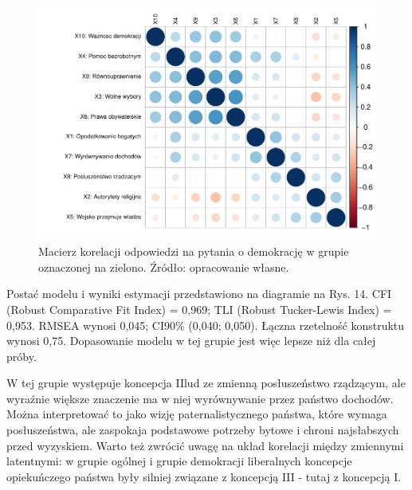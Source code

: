 \documentclass[12pt]{article}
\begin{document}
\begin{figure}

\includegraphics{text_ASA_files/figure-latex/cor-matrix-1-1} \hfill{}

\caption{Macierz korelacji odpowiedzi na pytania o demokrację w grupie oznaczonej na zielono. Źródło: opracowanie własne.}\label{fig:cor-matrix-1}
\end{figure}

Postać modelu i wyniki estymacji przedstawiono na diagramie na Rys. 14. CFI (Robust Comparative Fit Index) = 0,969; TLI (Robust Tucker-Lewis Index) = 0,953. RMSEA wynosi 0,045; CI90\% (0,040; 0,050). Łączna rzetelność konstruktu wynosi 0,75. Dopasowanie modelu w tej grupie jest więc lepsze niż dla całej próby.

W tej grupie występuje koncepcja IIlud ze zmienną posłuszeństwo rządzącym, ale wyraźnie większe znaczenie ma w niej wyrównywanie przez państwo dochodów. Można interpretować to jako wizję paternalistycznego państwa, które wymaga posłuszeństwa, ale zaspokaja podstawowe potrzeby bytowe i chroni najsłabszych przed wyzyskiem. Warto też zwrócić uwagę na układ korelacji między zmiennymi latentnymi: w grupie ogólnej i grupie demokracji liberalnych koncepcje opiekuńczego państwa były silniej związane z koncepcją III - tutaj z koncepcją I.
\end{document}
